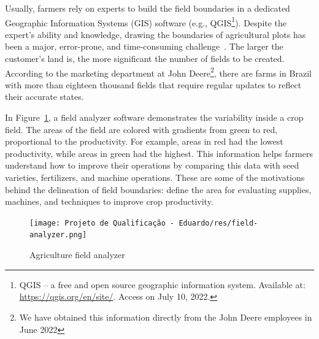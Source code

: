 \documentclass[12pt]{article}
\begin{document}
Usually, farmers rely on experts to build the field boundaries in a dedicated Geographic Information Systems (GIS) software (e.g., QGIS\footnote{QGIS -- a free and open source geographic information system. Available at: \url{https://qgis.org/en/site/}. Access on July 10, 2022.}). Despite the expert's ability and knowledge, drawing the boundaries of agricultural plots has been a major, error-prone, and time-consuming challenge~\cite{wagner2020}. The larger the customer's land is, the more significant the number of fields to be created. According to the marketing department at John Deere\footnote{We have obtained this information directly from the John Deere employees in June 2022}, there are farms in Brazil with more than eighteen thousand fields that require regular updates to reflect their accurate states. 

In Figure~\ref{figure:fieldanalyzer}, a field analyzer software demonstrates the variability inside a crop field. The areas of the field are colored with gradients from green to red, proportional to the productivity. For example, areas in red had the lowest productivity, while areas in green had the highest. This information helps farmers understand how to improve their operations by comparing this data with seed varieties, fertilizers, and machine operations. These are some of the motivations behind the delineation of field boundaries: define the area for evaluating supplies, machines, and techniques to improve crop productivity.

\begin{figure}[ht]
\centering
\texttt{[image: Projeto de Qualificação - Eduardo/res/field-analyzer.png]}
\caption{\label{figure:fieldanalyzer}Agriculture field analyzer\protect\footnotemark}
\end{figure}

\end{document}
